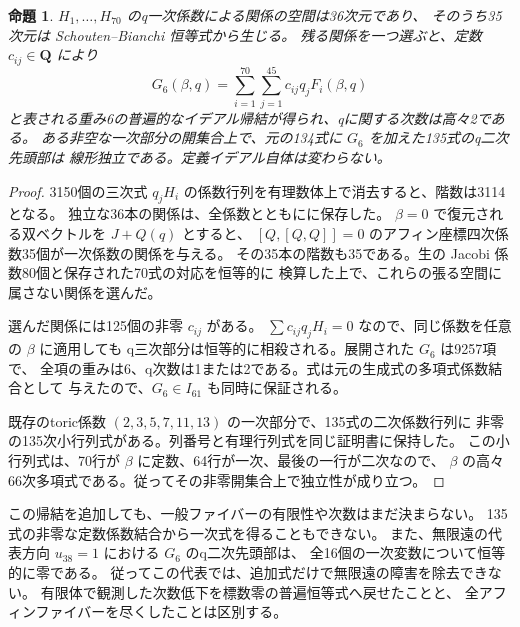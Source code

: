 \documentclass[11pt,a4paper]{ltjsarticle}
\newcommand{\QQ}{\mathbf Q}
\newtheorem{proposition}[theorem]{命題}
\theoremstyle{remark}
\begin{document}
\begin{proposition}\label{prop:weight6}
$H_1,\ldots,H_{70}$ のq一次係数による関係の空間は36次元であり、
そのうち35次元は Schouten--Bianchi 恒等式から生じる。
残る関係を一つ選ぶと、定数 $c_{ij}\in\QQ$ により
\[
 G_6(\beta,q)=\sum_{i=1}^{70}\sum_{j=1}^{45}c_{ij}q_jF_i(\beta,q)
\]
と表される重み6の普遍的なイデアル帰結が得られ、qに関する次数は高々2である。
ある非空な一次部分の開集合上で、元の134式に $G_6$ を加えた135式のq二次先頭部は
線形独立である。定義イデアル自体は変わらない。
\end{proposition}
\begin{proof}
3150個の三次式 $q_jH_i$ の係数行列を有理数体上で消去すると、階数は3114となる。
独立な36本の関係は、全係数とともに\cite{weight6-certificate}に保存した。
$\beta=0$ で復元される双ベクトルを $J+Q(q)$ とすると、
$[Q,[Q,Q]]=0$ のアフィン座標四次係数35個が一次係数の関係を与える。
その35本の階数も35である。生の Jacobi 係数80個と保存された70式の対応を恒等的に
検算した上で、これらの張る空間に属さない関係を選んだ。

選んだ関係には125個の非零 $c_{ij}$ がある。
$\sum c_{ij}q_jH_i=0$ なので、同じ係数を任意の $\beta$ に適用しても
q三次部分は恒等的に相殺される。展開された $G_6$ は9257項で、
全項の重みは6、q次数は1または2である。式は元の生成式の多項式係数結合として
与えたので、$G_6\in I_{61}$ も同時に保証される。

既存のtoric係数 $(2,3,5,7,11,13)$ の一次部分で、135式の二次係数行列に
非零の135次小行列式がある。列番号と有理行列式を同じ証明書に保持した。
この小行列式は、70行が $\beta$ に定数、64行が一次、最後の一行が二次なので、
$\beta$ の高々66次多項式である。従ってその非零開集合上で独立性が成り立つ。
\end{proof}

この帰結を追加しても、一般ファイバーの有限性や次数はまだ決まらない。
135式の非零な定数係数結合から一次式を得ることもできない。
また、無限遠の代表方向 $u_{38}=1$ における $G_6$ のq二次先頭部は、
全16個の一次変数について恒等的に零である。
従ってこの代表では、追加式だけで無限遠の障害を除去できない。
有限体で観測した次数低下を標数零の普遍恒等式へ戻せたことと、
全アフィンファイバーを尽くしたことは区別する。
\end{document}
